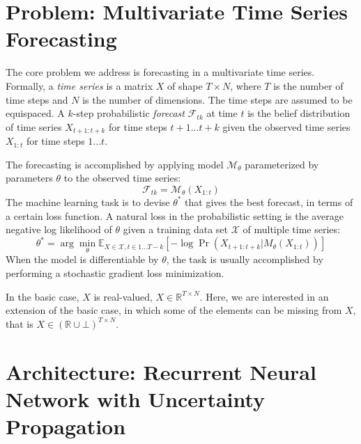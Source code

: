 \documentclass[runningheads]{llncs}
\begin{document}
\section{Problem: Multivariate Time Series Forecasting}

The core problem we address is forecasting in a multivariate
time series. Formally, a \textit{time series} is a matrix $X$
of shape $T\times N$, where $T$ is the number of time steps and
$N$ is the number of dimensions. The time steps are assumed to
be equispaced.  A $k$-step probabilistic \textit{forecast}
$\mathcal{F}_{tk}$ at time $t$ is the belief distribution of
time series $X_{t+1:t+k}$ for time steps $t+1 ... t+k$ given the
observed time series $X_{1:t}$ for time steps $1...t$.  

The forecasting is accomplished by applying model $\mathcal{M}_\theta$
parameterized by parameters $\theta$ to the observed time
series:
\begin{equation}
\mathcal{F}_{tk} = \mathcal{M}_\theta(X_{1:t})
\end{equation}
The machine learning task is to devise $\theta^*$
that gives the best forecast, in terms of a certain loss
function. A natural loss in the probabilistic setting is the
average negative log likelihood of $\theta$ given a training
data set $\mathcal{X}$ of multiple time series:
\begin{equation}
	\theta^* = \arg\min_\theta \mathbb{E}_{X \in \mathcal{X},t
	\in 1 ... T-k}\left[ -\log \Pr(X_{t+1:t+k}|M_\theta(X_{1:t}))\right]
	\label{eqn:theta-star}
\end{equation}
When the model is differentiable by $\theta$, the task is
usually accomplished by performing a stochastic gradient loss
minimization.

In the basic case, $X$ is real-valued, $X \in \mathbb{R}^{T
\times N}$. Here, we are interested in an extension of the basic
case, in which some of the elements can be missing from $X$, that is
$X \in (\mathbb{R} \cup \bot)^{T \times N}$.

\section{Architecture: Recurrent Neural Network with Uncertainty Propagation}
\end{document}
